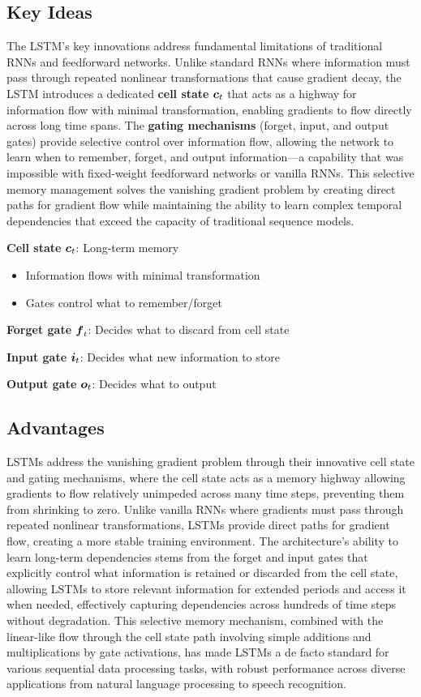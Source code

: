 \subsection{Key Ideas}

The LSTM's key innovations address fundamental limitations of traditional RNNs and feedforward networks. Unlike standard RNNs where information must pass through repeated nonlinear transformations that cause gradient decay, the LSTM introduces a dedicated \textbf{cell state} $\boldsymbol{c}_t$ that acts as a highway for information flow with minimal transformation, enabling gradients to flow directly across long time spans. The \textbf{gating mechanisms} (forget, input, and output gates) provide selective control over information flow, allowing the network to learn when to remember, forget, and output information—a capability that was impossible with fixed-weight feedforward networks or vanilla RNNs. This selective memory management solves the vanishing gradient problem by creating direct paths for gradient flow while maintaining the ability to learn complex temporal dependencies that exceed the capacity of traditional sequence models.

\textbf{Cell state} $\boldsymbol{c}_t$: Long-term memory
\begin{itemize}
    \item Information flows with minimal transformation
    \item Gates control what to remember/forget
\end{itemize}

\textbf{Forget gate} $\boldsymbol{f}_t$: Decides what to discard from cell state

\textbf{Input gate} $\boldsymbol{i}_t$: Decides what new information to store

\textbf{Output gate} $\boldsymbol{o}_t$: Decides what to output

\subsection{Advantages}

LSTMs address the vanishing gradient problem through their innovative cell state and gating mechanisms, where the cell state acts as a memory highway allowing gradients to flow relatively unimpeded across many time steps, preventing them from shrinking to zero. Unlike vanilla RNNs where gradients must pass through repeated nonlinear transformations, LSTMs provide direct paths for gradient flow, creating a more stable training environment. The architecture's ability to learn long-term dependencies stems from the forget and input gates that explicitly control what information is retained or discarded from the cell state, allowing LSTMs to store relevant information for extended periods and access it when needed, effectively capturing dependencies across hundreds of time steps without degradation. This selective memory mechanism, combined with the linear-like flow through the cell state path involving simple additions and multiplications by gate activations, has made LSTMs a de facto standard for various sequential data processing tasks, with robust performance across diverse applications from natural language processing to speech recognition.

